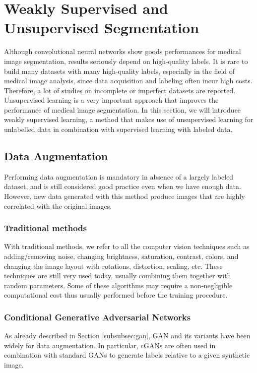 \section{Weakly Supervised and Unsupervised Segmentation}
Although convolutional neural networks show goods performances for medical image
segmentation, results seriously depend on high-quality labels. It is rare to
build many datasets with many high-quality labels, especially in the field of
medical image analysis, since data acquisition and labeling often incur high
costs. Therefore, a lot of studies on incomplete or imperfect datasets are
reported. Unsupervised learning is a very important approach that improves the
performance of medical image segmentation. In this section, we will introduce
weakly supervised learning, a method that makes use of unsupervised learning for
unlabelled data in combination with supervised learning with labeled data.

\subsection{Data Augmentation}
Performing data augmentation is mandatory in absence of a largely labeled
dataset, and is still considered good practice even when we have enough data.
However, new data generated with this method produce images that are highly
correlated with the original images.

\subsubsection{Traditional methods}
With traditional methods, we refer to all the computer vision techniques such as
adding/removing noise, changing brightness, saturation, contrast, colors, and
changing the image layout with rotations, distortion, scaling, etc. These
techniques are still very used today, usually combining them together with
random parameters. Some of these algorithms may require a non-negligible
computational cost thus usually performed before the training procedure.

\subsubsection{Conditional Generative Adversarial Networks}
As already described in Section \ref{subsubsec:gan}, GAN and its variants have
been widely for data augmentation. In particular, cGANs are often used in
combination with standard GANs to generate labels relative to a given synthetic
image.

